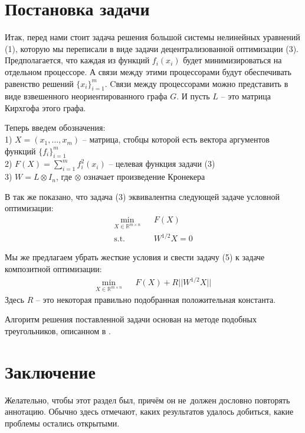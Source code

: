 \documentclass[12pt, twoside]{article}
\begin{document}
\section{Постановка задачи}
Итак, перед нами стоит задача решения большой системы нелинейных уравнений (1), которую мы переписали в виде задачи децентрализованной оптимизации (3). Предполагается, что каждая из функций $f_i(x_i)$ будет минимизироваться на отдельном процессоре. А связи между этими процессорами будут обеспечивать равенство решений $\{x_i\}_{i=1}^m$. Cвязи между процессорами можно представить в виде взвешенного неориентированного графа $G$. И пусть $L$ -- это матрица Кирхгофа этого графа.

Теперь введем обозначения:\\
1) $X = (x_1,\ldots,x_m)$ -- матрица, стобцы которой есть вектора аргументов функций $\{f_i\}_{i=1}^m$\\
2) $F(X) = \sum\limits_{i = 1}^m f^2_i(x_i)$ -- целевая функция задачи (3)\\
3) $W = L\otimes I_n$, где $\otimes$ означает произведение Кронекера

В \cite{Karimi1} так же показано, что задача (3) эквивалентна следующей задаче условной оптимизации:
\begin{eqnarray}
    \label{5}
    \min\limits_{X \in \mathbb{R}^{m\times n}} && F(X)
    \nonumber\\
    \text{s.t.} && W^{1/2}X = 0
\end{eqnarray}

Мы же предлагаем убрать жесткие условия и свести задачу (5) к задаче композитной оптимизации:
\begin{eqnarray}
    \label{6}
    \min\limits_{X \in \mathbb{R}^{m\times n}} && F(X) + R||W^{1/2}X||
\end{eqnarray}
Здесь $R$ -- это некоторая правильно подобранная положительная константа.

Алгоритм решения поставленной задачи основан на методе подобных треугольников, описанном в \cite{Gasnikov2}.

\section{Заключение}
Желательно, чтобы этот раздел был, причём он не~должен дословно повторять аннотацию.
Обычно здесь отмечают, каких результатов удалось добиться, какие проблемы остались открытыми.






\end{document}
